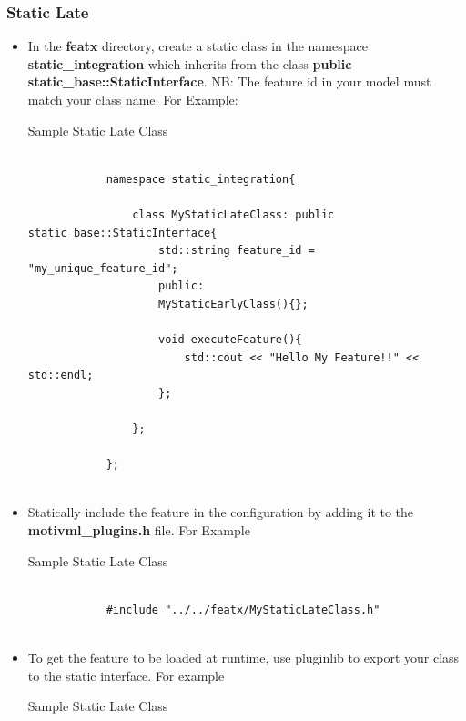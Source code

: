 \documentclass{article}
\newenvironment{longlisting}{\captionsetup{type=listing}}{}
\begin{document}
\subsubsection{Static Late}
\begin{itemize}
	\item In the \textbf{featx} directory, create a static class in the namespace \textbf{static\_integration} which inherits from the class \textbf{public static\_base::StaticInterface}. NB: The feature id in your model must match your class name. For Example:
	
	\begin{longlisting}
		\caption{Sample Static Late Class}
		\begin{verbatim}
			
			namespace static_integration{
				
				class MyStaticLateClass: public static_base::StaticInterface{
					std::string feature_id = "my_unique_feature_id";
					public:
					MyStaticEarlyClass(){};
					
					void executeFeature(){
						std::cout << "Hello My Feature!!" << std::endl;
					};
					
				};
				
			};
			
		\end{verbatim}
		\label{samplestaticlate}
	\end{longlisting}
	\item Statically include the feature in the configuration by adding it to the \textbf{motivml\_plugins.h} file. For Example
	
	\begin{longlisting}
		\caption{Sample Static Late Class}
		\begin{verbatim}
			
			#include "../../featx/MyStaticLateClass.h"
			
		\end{verbatim}
		\label{samplestaticlateinclude}
	\end{longlisting}
	
	\item To get the feature to be loaded at runtime, use pluginlib to export your class to the static interface. For example 
	
	\begin{longlisting}
		\caption{Sample Static Late Class}
		\begin{verbatim}
			

\end{verbatim}
\end{longlisting}
\end{itemize}
\end{document}

